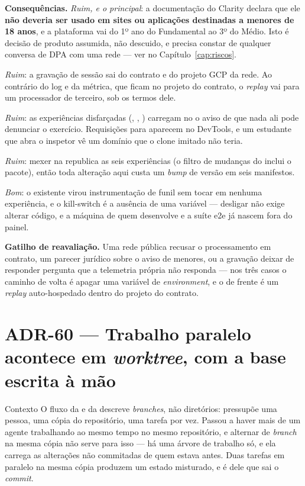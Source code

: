 \textbf{Consequências.} \emph{Ruim, e o principal}: a documentação do Clarity
declara que ele \textbf{não deveria ser usado em sites ou aplicações destinadas
a menores de 18 anos}, e a plataforma vai do 1º ano do Fundamental ao 3º do
Médio. Isto é decisão de produto assumida, não descuido, e precisa constar de
qualquer conversa de DPA com uma rede --- ver  no
Capítulo~\ref{cap:riscos}.

\emph{Ruim}: a gravação de sessão sai do contrato e do projeto GCP da rede. Ao
contrário do log e da métrica, que ficam no projeto do contrato, o
\emph{replay} vai para um processador de terceiro, sob os termos dele.

\emph{Ruim}: as experiências disfarçadas (, ,
) carregam no  o aviso de que nada ali pode
denunciar o exercício. Requisições para  aparecem no DevTools, e
um estudante que abra o inspetor vê um domínio que o clone imitado não teria.

\emph{Ruim}: mexer na  republica as seis experiências (o filtro de
mudanças do  inclui o pacote), então toda alteração aqui custa
um \emph{bump} de versão em seis manifestos.

\emph{Bom}: o  existente virou instrumentação de funil sem tocar em
nenhuma experiência, e o kill-switch é a ausência de uma variável --- desligar
não exige alterar código, e a máquina de quem desenvolve e a suíte e2e já
nascem fora do painel.

\textbf{Gatilho de reavaliação.} Uma rede pública recusar o processamento em
contrato, um parecer jurídico sobre o aviso de menores, ou a gravação deixar de
responder pergunta que a telemetria própria não responda --- nos três casos o
caminho de volta é apagar uma variável de \emph{environment}, e o de frente é
um \emph{replay} auto-hospedado dentro do projeto do contrato.

\section{ADR-60 --- Trabalho paralelo acontece em \emph{worktree}, com a base
escrita à mão}
\label{adr:worktree}

\begin{especificacao}{Contexto}
O fluxo da  e da  descreve \emph{branches}, não
diretórios: pressupõe uma pessoa, uma cópia do repositório, uma tarefa por vez.
Passou a haver mais de um agente trabalhando ao mesmo tempo no mesmo
repositório, e alternar de \emph{branch} na mesma cópia não serve para isso ---
há uma árvore de trabalho só, e ela carrega as alterações não commitadas de
quem estava antes. Duas tarefas em paralelo na mesma cópia produzem um estado
misturado, e é dele que sai o \emph{commit}.
\end{especificacao}

